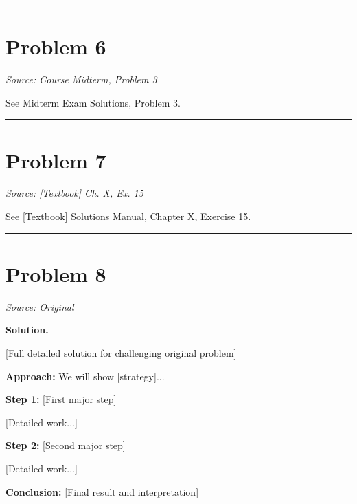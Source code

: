 \documentclass[11pt,a4paper]{article}
\newenvironment{solution}{%
    \par\medskip\noindent\textbf{Solution.}\enspace
}{%
    \par\medskip
}
\begin{document}
\bigskip
\hrule
\bigskip

\section*{Problem 6}
\textit{Source: Course Midterm, Problem 3}

See Midterm Exam Solutions, Problem 3.

\bigskip
\hrule
\bigskip

\section*{Problem 7}
\textit{Source: [Textbook] Ch. X, Ex. 15}

See [Textbook] Solutions Manual, Chapter X, Exercise 15.

\bigskip
\hrule
\bigskip

\section*{Problem 8}
\textit{Source: Original}

\begin{solution}
[Full detailed solution for challenging original problem]

\textbf{Approach:} We will show [strategy]...

\textbf{Step 1:} [First major step]

[Detailed work...]

\textbf{Step 2:} [Second major step]

[Detailed work...]

\textbf{Conclusion:} [Final result and interpretation]
\end{solution}
\end{document}
